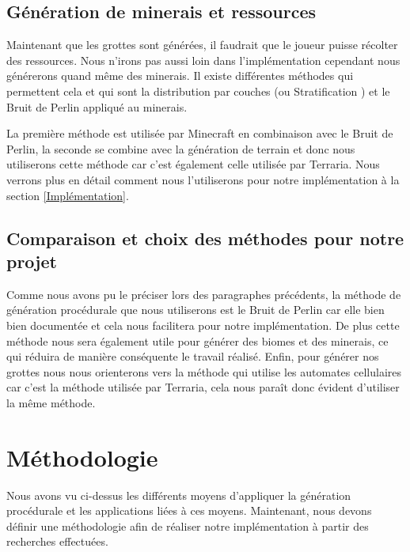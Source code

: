\documentclass{article}
\begin{document}
\subsection{Génération de minerais et ressources}
Maintenant que les grottes sont générées, il faudrait que le joueur puisse récolter des ressources. Nous n'irons pas aussi loin dans l'implémentation cependant nous générerons quand même des minerais. Il existe différentes méthodes qui permettent cela et qui sont la distribution par couches (ou Stratification \cite{stratification}) et le Bruit de Perlin appliqué au minerais. \par
La première méthode est utilisée par Minecraft en combinaison avec le Bruit de Perlin, la seconde se combine avec la génération de terrain et donc nous utiliserons cette méthode car c'est également celle utilisée par Terraria. Nous verrons plus en détail comment nous l'utiliserons pour notre implémentation à la section \ref{Implémentation}.


\subsection{Comparaison et choix des méthodes pour notre projet}

Comme nous avons pu le préciser lors des paragraphes précédents, la méthode de génération procédurale que nous utiliserons est le Bruit de Perlin car elle bien bien documentée et cela nous facilitera pour notre implémentation. De plus cette méthode nous sera également utile pour générer des biomes et des minerais, ce qui réduira de manière conséquente le travail réalisé. Enfin, pour générer nos grottes nous nous orienterons vers la méthode qui utilise les automates cellulaires car c'est la méthode utilisée par Terraria, cela nous paraît donc évident d'utiliser la même méthode. 

\section{Méthodologie}

Nous avons vu ci-dessus les différents moyens d'appliquer la génération procédurale et les applications liées à ces moyens. Maintenant, nous devons définir une méthodologie afin de réaliser notre implémentation à partir des recherches effectuées.
\end{document}
